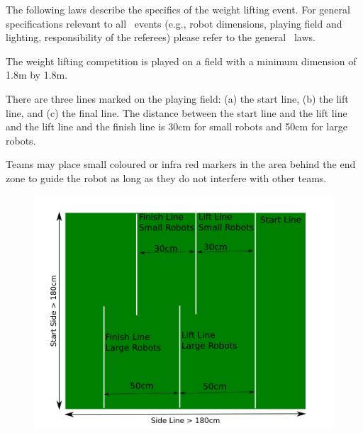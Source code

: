 \documentclass[12pt]{hurocup}
\begin{document}
The following laws describe the specifics of the weight lifting
event. For general specifications relevant to all \HuroCup\ events
(e.g., robot dimensions, playing field and lighting, responsibility of
the referees) please refer to the general \HuroCup\ laws.

\label{mr-field}

\begin{lawlist}[WL]
\item The weight lifting competition is played on a field with a
minimum dimension of 1.8m by 1.8m.

\item There are three lines marked on the playing field: (a) the start line,
 (b) the lift line, and (c) the final line. The distance between the
 start line and the lift line and the lift line and the finish line is
 30cm for small robots and 50cm for large robots.

\item Teams may place small coloured or infra red markers in the area
 behind the end zone to guide the robot as long as they do not
 interfere with other teams.

\begin{figure}
  \begin{center}
    \includegraphics[width=0.70\linewidth]{Figures/weight-lifting}
  \end{center}
\end{figure}

\end{lawlist}

\end{document}
